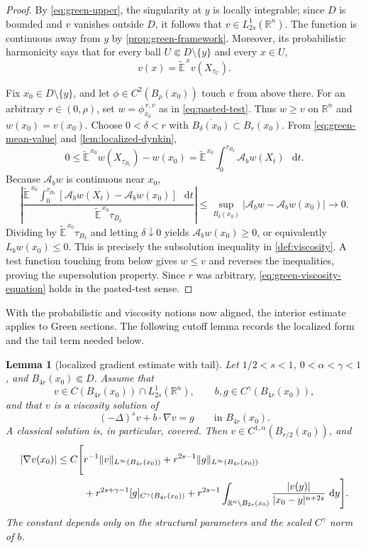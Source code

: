\documentclass[reqno]{amsart}
\numberwithin{equation}{section}
\theoremstyle{plain}
\newtheorem{lemma}[theorem]{Lemma}
\theoremstyle{definition}
\theoremstyle{remark}
\newcommand{\R}{\mathbb R}
\newcommand{\differential}{\mathop{}\!\mathrm d}
\newcommand{\rev}[1]{#1}
\begin{document}
\begin{proof}
By \eqref{eq:green-upper}, the singularity at $y$ is locally integrable;
since $D$ is bounded and $v$ vanishes outside $D$, it follows that
$v\in L^1_{2s}(\R^n)$.  The function is continuous away from $y$ by
\cref{prop:green-framework}.  Moreover, its probabilistic harmonicity says
that for every ball $U\Subset D\setminus\{y\}$ and every $x\in U$,
\begin{equation}\label{eq:green-mean-value}
 v(x)=\widetilde{\mathbb E}^{\,x}v(X_{\tau_U}).
\end{equation}

Fix $x_0\in D\setminus\{y\}$, and let $\phi\in C^2(B_\rho(x_0))$ touch
$v$ from above there.  For an arbitrary $r\in(0,\rho)$, set
$w=\phi^{\,r,v}_{x_0}$ as in \eqref{eq:pasted-test}.  Thus $w\ge v$ on
$\R^n$ and $w(x_0)=v(x_0)$.  Choose
$0<\delta<r$ with $\overline{B_\delta(x_0)}\subset B_r(x_0)$.  From
\eqref{eq:green-mean-value} and \cref{lem:localized-dynkin},
\[
 0\le \widetilde{\mathbb E}^{\,x_0}
       w(X_{\tau_{B_\delta}})-w(x_0)
 =\widetilde{\mathbb E}^{\,x_0}\int_0^{\tau_{B_\delta}}
       \mathcal A_bw(X_t)\,\differential t.
\]
Because $\mathcal A_bw$ is continuous near $x_0$,
\[
 \left|\frac{\widetilde{\mathbb E}^{\,x_0}
 \int_0^{\tau_{B_\delta}}
 [\mathcal A_bw(X_t)-\mathcal A_bw(x_0)]\,\differential t}
 {\widetilde{\mathbb E}^{\,x_0}\tau_{B_\delta}}\right|
 \le \sup_{B_\delta(x_0)}
 |\mathcal A_bw-\mathcal A_bw(x_0)|\longrightarrow0.
\]
Dividing by $\widetilde{\mathbb E}^{\,x_0}\tau_{B_\delta}$ and letting
$\delta\downarrow0$ yields $\mathcal A_bw(x_0)\ge0$, or equivalently
$L_bw(x_0)\le0$.  This is precisely the subsolution inequality in
\cref{def:viscosity}.  A test function touching from below gives
$w\le v$ and reverses the inequalities, proving the supersolution
property.  Since $r$ was arbitrary, \eqref{eq:green-viscosity-equation}
holds in the pasted-test sense.
\end{proof}
\endgroup

\rev{With the probabilistic and viscosity notions now aligned, the interior
estimate applies to Green sections.  The following cutoff lemma records the
localized form and the tail term needed below.}

\begin{lemma}[localized gradient estimate with tail]
\label{lem:localized-gradient-tail}
Let $1/2<s<1$, $0<\alpha<\gamma<1$, and
$B_{4r}(x_0)\Subset D$.  Assume that
\[
 v\in C(B_{4r}(x_0))\cap L^1_{2s}(\R^n),
 \qquad b,g\in C^\gamma(B_{4r}(x_0)),
\]
and that $v$ is a viscosity solution of
\[
 (-\Delta)^sv+b\cdot\nabla v=g
 \qquad\text{in }B_{4r}(x_0).
\]
A classical solution is, in particular, covered.  Then
$v\in C^{1,\alpha}(B_{r/2}(x_0))$, and
\begin{align}\label{eq:localized-gradient-tail}
 |\nabla v(x_0)|\le C\Bigg[&r^{-1}\|v\|_{L^\infty(B_{4r}(x_0))}
 +r^{2s-1}\|g\|_{L^\infty(B_{4r}(x_0))}\notag\\
 &+r^{2s+\gamma-1}[g]_{C^\gamma(B_{4r}(x_0))}
 +r^{2s-1}\int_{\R^n\setminus B_{2r}(x_0)}
 \frac{|v(y)|}{|x_0-y|^{n+2s}}\,\differential y\Bigg].
\end{align}
The constant depends only on the structural parameters and the scaled
$C^\gamma$ norm of $b$.
\end{lemma}
\end{document}
